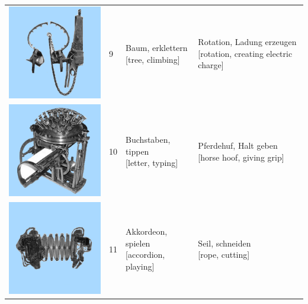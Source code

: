 \documentclass[
  english,
  man,floatsintext]{apa7}
\begin{document}
\begin{center}
\begin{ThreePartTable}
{\begin{longtable}{llll}
\includegraphics[valign=c, scale=0.23]{../materials/unfamiliar/9.png} & 9 & \makecell[l]{Baum, erklettern\\{[tree, climbing]}} & \makecell[l]{Rotation, Ladung erzeugen\\{[rotation, creating electric charge]}}\\
\includegraphics[valign=c, scale=0.23]{../materials/unfamiliar/10.png} & 10 & \makecell[l]{Buchstaben, tippen\\{[letter, typing]}} & \makecell[l]{Pferdehuf, Halt geben\\{[horse hoof, giving grip]}}\\
\includegraphics[valign=c, scale=0.23]{../materials/unfamiliar/11.png} & 11 & \makecell[l]{Akkordeon, spielen\\{[accordion, playing]}} & \makecell[l]{Seil, schneiden\\{[rope, cutting]}}\\

\end{longtable}}
\end{ThreePartTable}
\end{center}
\end{document}
